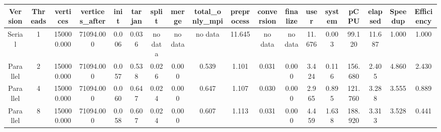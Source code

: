 \begin{tabular}{|c|c|c|c|c|c|c|c|c|c|c|c|c|c|c|c|c|c|}
\toprule
 Version &  Threads &   vertices &  vertices\_after &  init &  tarjan &   split &   merge & total\_only\_mpi &  preprocess & conversion & finalize &   user &  system &    pCPU &  elapsed &  Speedup &  Efficiency \\
\midrule
  Serial &        1 & 150000.000 &       71094.000 & 0.006 &   0.036 & no data & no data &        no data &      11.645 &    no data &  no data & 11.676 &   0.003 &  99.120 &   11.687 &    1.000 &       1.000 \\
Parallel &        2 & 150000.000 &       71094.000 & 0.057 &   0.538 &   0.026 &   0.000 &          0.539 &       1.101 &      0.031 &    0.000 &  3.424 &   0.116 & 156.680 &    2.405 &    4.860 &       2.430 \\
Parallel &        4 & 150000.000 &       71094.000 & 0.060 &   0.647 &   0.024 &   0.000 &          0.647 &       1.107 &      0.030 &    0.000 &  2.965 &   0.895 & 121.760 &    3.288 &    3.555 &       0.889 \\
Parallel &        8 & 150000.000 &       71094.000 & 0.058 &   0.607 &   0.024 &   0.000 &          0.607 &       1.113 &      0.031 &    0.000 &  4.459 &   1.638 & 188.920 &    3.313 &    3.528 &       0.441 \\
\bottomrule
\end{tabular}
